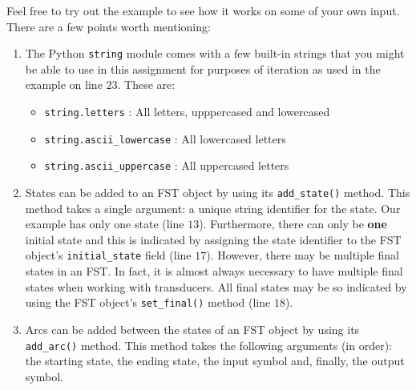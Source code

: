\documentclass[11pt,letterpaper]{article}
\begin{document}
 Feel free to try out the example to see how it works on some of your
own input. There are a few points worth mentioning:
\begin{enumerate}
	\item The Python \texttt{string} module comes with a few
          built-in strings that you might be able to use in this
          assignment for purposes of iteration as used in the example
          on line $23$. These are:
	\begin{itemize}
		\item \texttt{string.letters} : All letters, upppercased and lowercased
		\item \texttt{string.ascii\_lowercase} : All lowercased letters
		\item \texttt{string.ascii\_uppercase} : All uppercased letters
	\end{itemize}
	\item States can be added to an FST object by using its
          \texttt{add\_state()} method. This method takes a single
          argument: a unique string identifier for the state. Our
          example has only one state (line $13$). Furthermore, there
          can only be \textbf{one} initial state and this is indicated
          by assigning the state identifier to the FST object's
          \texttt{initial\_state} field (line $17$). However, there
          may be multiple final states in an FST. In fact, it is
          almost always necessary to have multiple final states when
          working with transducers. All final states may be so
          indicated by using the FST object's \texttt{set\_final()}
          method (line $18$).
	\item Arcs can be added between the states of an FST object by
          using its \texttt{add\_arc()} method. This method takes the
          following arguments (in order): the starting state, the
          ending state, the input symbol and, finally, the output
          symbol. 
	

\end{enumerate}
\end{document}
